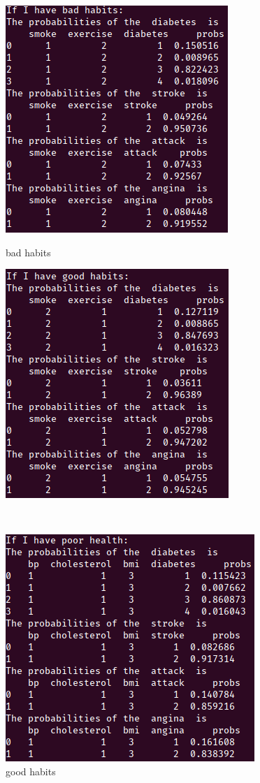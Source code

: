 \documentclass[aps,letterpaper,10pt]{revtex4}
\begin{document}
\begin{figure}[h]
\centering
\begin{minipage}[t]{0.5\linewidth}
    \centering
    \includegraphics[scale=0.5]{2(a)(1).png}
    \caption{bad habits}
\end{minipage}%
\begin{minipage}[t]{0.5\linewidth}
    \centering
    \includegraphics[scale=0.5]{2(a)(2).png}
    \caption{good habits}
\end{minipage}\\
\centering
\begin{minipage}[t]{0.5\linewidth}
    \centering
    \includegraphics[scale=0.5]{2(b)(1).png}

\end{minipage}
\end{figure}
\end{document}
